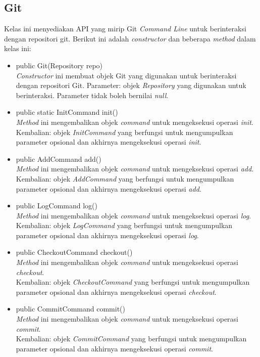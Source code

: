 \subsection{Git}
\label{subsec:Git}
Kelas ini menyediakan API yang mirip Git \textit{Command Line} untuk berinteraksi dengan repositori git. Berikut ini adalah \textit{constructor} dan beberapa \textit{method} dalam kelas ini:
\begin{itemize}
\item public Git(Repository repo)\\
\textit{Constructor} ini membuat objek Git yang digunakan untuk berinteraksi dengan repositori Git.
Parameter: objek \textit{Repository} yang digunakan untuk berinteraksi. Parameter tidak boleh bernilai \textit{null}. 

\item public static InitCommand init()\\
\textit{Method} ini mengembalikan objek \textit{command} untuk mengeksekusi operasi \textit{init}.\\
Kembalian: objek \textit{InitCommand} yang berfungsi untuk mengumpulkan parameter opsional dan akhirnya mengeksekusi operasi \textit{init}.

\item public AddCommand add()\\
\textit{Method} ini mengembalikan objek \textit{command} untuk mengeksekusi operasi \textit{add}.\\
Kembalian: objek \textit{AddCommand} yang berfungsi untuk mengumpulkan parameter opsional dan akhirnya mengeksekusi operasi \textit{add}.

\item public LogCommand log()\\
\textit{Method} ini mengembalikan objek \textit{command} untuk mengeksekusi operasi \textit{log}.\\
Kembalian: objek \textit{LogCommand} yang berfungsi untuk mengumpulkan parameter opsional dan akhirnya mengeksekusi operasi \textit{log}.

\item public CheckoutCommand checkout()\\
\textit{Method} ini mengembalikan objek \textit{command} untuk mengeksekusi operasi \textit{checkout}.\\
Kembalian: objek \textit{CheckoutCommand} yang berfungsi untuk mengumpulkan parameter opsional dan akhirnya mengeksekusi operasi \textit{checkout}.

\item public CommitCommand commit()\\
\textit{Method} ini mengembalikan objek \textit{command} untuk mengeksekusi operasi \textit{commit}.\\
Kembalian: objek \textit{CommitCommand} yang berfungsi untuk mengumpulkan parameter opsional dan akhirnya mengeksekusi operasi \textit{commit}.


\end{itemize}
